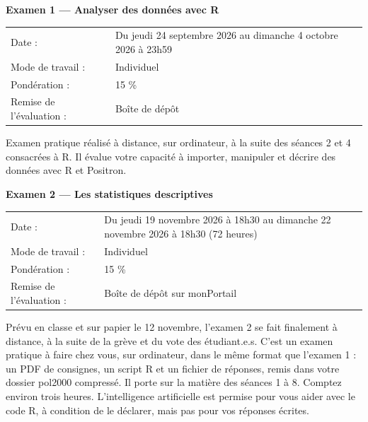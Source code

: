 \documentclass[10pt]{article}
\newcommand{\ulsubsub}[1]{%
  \needspace{3\baselineskip}%
  \vspace{8pt}%
  {\headfont\fontsize{11}{13}\selectfont\bfseries #1}\par
  \vspace{1pt}%
}
\begin{document}
\ulsubsub{Examen 1 --- Analyser des données avec R}
{\fontsize{9.5}{12.5}\selectfont
\begin{tabular}{@{}L{1.9in}L{5.4in}@{}}
Date : & Du jeudi 24 septembre 2026 au dimanche 4 octobre 2026 à 23h59\\
Mode de travail : & Individuel\\
Pondération : & 15 \%\\
Remise de l'évaluation : & Boîte de dépôt\\
\end{tabular}\par
\vspace{4pt}
Examen pratique réalisé à distance, sur ordinateur, à la suite des séances 2 et 4 consacrées à R. Il évalue votre capacité à importer, manipuler et décrire des données avec R et Positron.\par}

\ulsubsub{Examen 2 --- Les statistiques descriptives}
{\fontsize{9.5}{12.5}\selectfont
\begin{tabular}{@{}L{1.9in}L{5.4in}@{}}
Date : & Du jeudi 19 novembre 2026 à 18h30 au dimanche 22 novembre 2026 à 18h30 (72 heures)\\
Mode de travail : & Individuel\\
Pondération : & 15 \%\\
Remise de l'évaluation : & Boîte de dépôt sur monPortail\\
\end{tabular}\par
\vspace{4pt}
Prévu en classe et sur papier le 12 novembre, l'examen 2 se fait finalement à distance, à la suite de la grève et du vote des étudiant.e.s. C'est un examen pratique à faire chez vous, sur ordinateur, dans le même format que l'examen 1 : un PDF de consignes, un script R et un fichier de réponses, remis dans votre dossier pol2000 compressé. Il porte sur la matière des séances 1 à 8. Comptez environ trois heures. L'intelligence artificielle est permise pour vous aider avec le code R, à condition de le déclarer, mais pas pour vos réponses écrites.\par}
\end{document}
